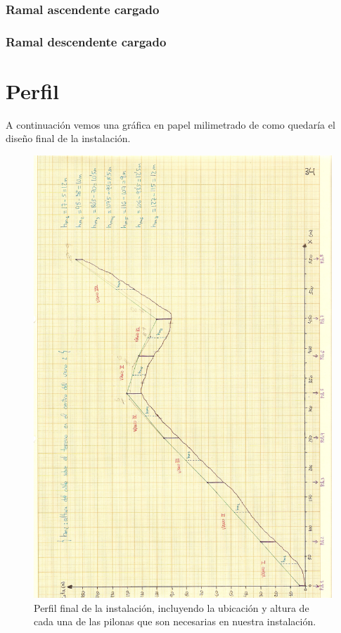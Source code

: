 \documentclass[a4paper,11pt]{article}
\begin{document}
\section{Ramal ascendente cargado}
\section{Ramal descendente cargado}
\part{Perfil}
A continuación vemos una gráfica en papel milimetrado de como quedaría el diseño final de la instalación.\\
\vspace{80mm}
\begin{figure}
\raggedright
\includegraphics[scale=.75]{Perfil.jpg}
\caption{Perfil final de la instalación, incluyendo la ubicación y altura de cada una de las pilonas que son necesarias en nuestra instalación.}
\label{perfil}
\end{figure}


\end{document}
